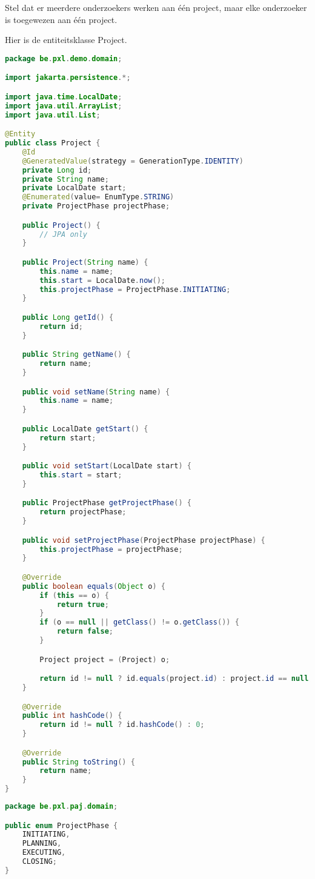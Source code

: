 Stel dat er meerdere onderzoekers werken aan één project, maar elke onderzoeker is toegewezen aan één project.

Hier is de entiteitsklasse Project.

\begin{lstlisting}[frame=single, language=java]
package be.pxl.demo.domain;

import jakarta.persistence.*;

import java.time.LocalDate;
import java.util.ArrayList;
import java.util.List;

@Entity
public class Project {
	@Id
	@GeneratedValue(strategy = GenerationType.IDENTITY)
	private Long id;
	private String name;
	private LocalDate start;
	@Enumerated(value= EnumType.STRING)
	private ProjectPhase projectPhase;

	public Project() {
	    // JPA only
	}

	public Project(String name) {
		this.name = name;
		this.start = LocalDate.now();
		this.projectPhase = ProjectPhase.INITIATING;
	}

	public Long getId() {
		return id;
	}

	public String getName() {
		return name;
	}

	public void setName(String name) {
		this.name = name;
	}

	public LocalDate getStart() {
		return start;
	}

	public void setStart(LocalDate start) {
		this.start = start;
	}

	public ProjectPhase getProjectPhase() {
		return projectPhase;
	}

	public void setProjectPhase(ProjectPhase projectPhase) {
		this.projectPhase = projectPhase;
	}

	@Override
	public boolean equals(Object o) {
		if (this == o) {
			return true;
		}
		if (o == null || getClass() != o.getClass()) {
			return false;
		}

		Project project = (Project) o;

		return id != null ? id.equals(project.id) : project.id == null;
	}

	@Override
	public int hashCode() {
		return id != null ? id.hashCode() : 0;
	}

	@Override
	public String toString() {
		return name;
	}
}

\end{lstlisting}

\begin{lstlisting}[frame=single, language=java]
package be.pxl.paj.domain;

public enum ProjectPhase {
	INITIATING,
	PLANNING,
	EXECUTING,
	CLOSING;
}
\end{lstlisting}

